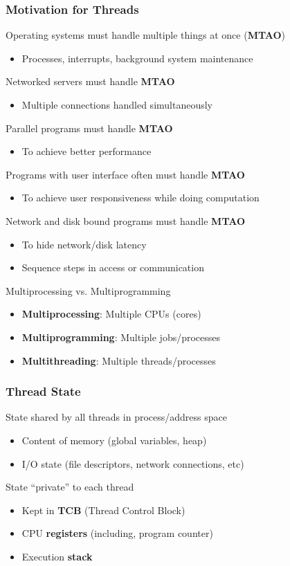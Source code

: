 \subsubsection{Motivation for Threads}
Operating systems must handle multiple things at once (\textbf{MTAO})
\begin{itemize}
    \item Processes, interrupts, background system maintenance
\end{itemize}
Networked servers must handle \textbf{MTAO}
\begin{itemize}
    \item Multiple connections handled simultaneously
\end{itemize}
Parallel programs must handle \textbf{MTAO}
\begin{itemize}
    \item To achieve better performance
\end{itemize}
Programs with user interface often must handle \textbf{MTAO}
\begin{itemize}
    \item To achieve user responsiveness while doing computation
\end{itemize}
Network and disk bound programs must handle \textbf{MTAO}
\begin{itemize}
    \item To hide network/disk latency
    \item Sequence steps in access or communication
\end{itemize}

\begin{tcolorbox}
\begin{discussion}
Multiprocessing vs. Multiprogramming
\end{discussion}
\begin{itemize}
    \item \textbf{Multiprocessing}: Multiple CPUs (cores)
    \item \textbf{Multiprogramming}: Multiple jobs/processes
    \item \textbf{Multithreading}: Multiple threads/processes
\end{itemize}
\end{tcolorbox}

\subsubsection{Thread State}
State shared by all threads in process/address space
\begin{itemize}
    \item Content of memory (global variables, heap)
    \item I/O state (file descriptors, network connections, etc)
\end{itemize}

State “private” to each thread
\begin{itemize}
    \item Kept in \textbf{TCB} (Thread Control Block)
    \item CPU \textbf{registers} (including, program counter)
    \item Execution \textbf{stack}
\end{itemize}
